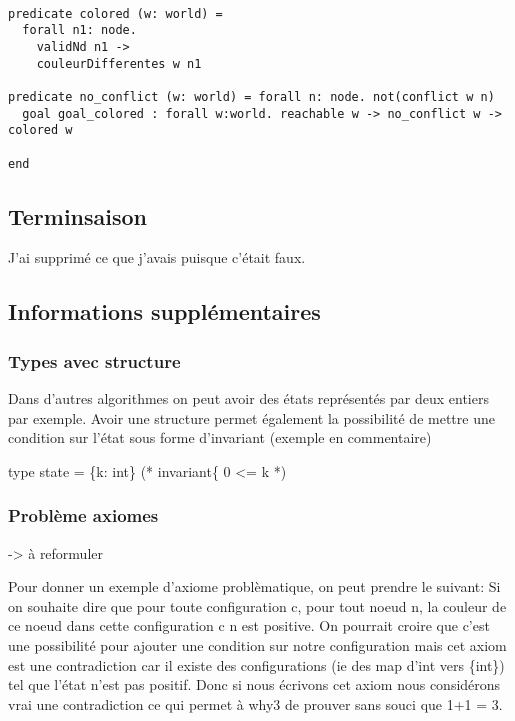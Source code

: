 \documentclass[11pt]{article}
\begin{document}
\lstset{language=why3,label= ,caption= ,captionpos=b,numbers=none}
\begin{lstlisting}

predicate colored (w: world) =
  forall n1: node.
    validNd n1 ->
    couleurDifferentes w n1

predicate no_conflict (w: world) = forall n: node. not(conflict w n)
  goal goal_colored : forall w:world. reachable w -> no_conflict w -> colored w

end

\end{lstlisting}

\subsection{Terminsaison}
\label{sec:orgb152f14}

J'ai supprimé ce que j'avais puisque c'était faux.


\subsection{Informations supplémentaires}
\label{sec:orgd1bb41b}

\subsubsection{Types avec structure}
\label{sec:org4eae3ff}

Dans d'autres algorithmes on peut avoir des états représentés par deux entiers par exemple.
Avoir une structure permet également la possibilité de mettre une condition sur l'état sous forme d'invariant (exemple en commentaire)

  type state = \{k: int\}
(*  invariant\{ 0 <= k  *)


\subsubsection{Problème axiomes}
\label{sec:org1d8d183}

-> à reformuler

Pour donner un exemple d'axiome problèmatique, on peut prendre le suivant: 
Si on souhaite dire que pour toute configuration c, pour tout noeud n, la couleur de ce noeud dans cette configuration c n est positive. 
On pourrait croire que c'est une possibilité pour ajouter une condition sur notre configuration mais cet axiom est une contradiction car il existe des configurations (ie des map d'int vers \{int\})
tel que l'état n'est pas positif.
Donc si nous écrivons cet axiom nous considérons vrai une contradiction ce qui permet à why3 de prouver sans souci que 1+1 = 3.
\end{document}
